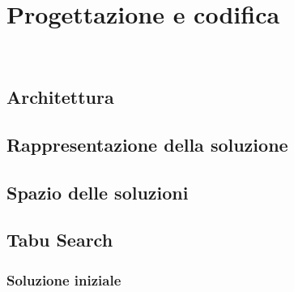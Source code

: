 
\chapter{Progettazione e codifica}
\label{cap:progettazione-codifica}

\noindent {}\\

\section{Architettura}
\label{sec:progettazione}


\section{Rappresentazione della soluzione}
\label{sec:rappresentazione-della-soluzione}

\section{Spazio delle soluzioni}
\label{sec:spazio-delle-soluzioni}

\section{Tabu Search}
\label{sec:tabu-search}

\subsection{Soluzione iniziale}
\label{sec:soluzione-iniziale}

